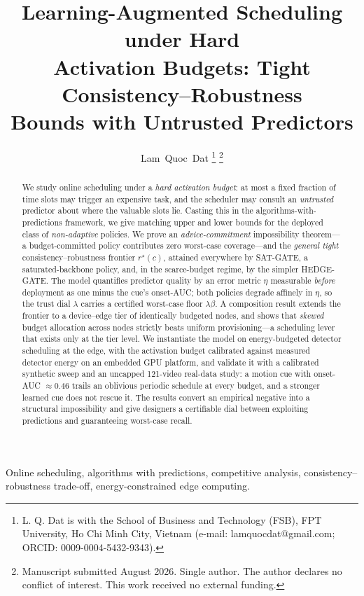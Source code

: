 ﻿\documentclass[lettersize,journal]{IEEEtran}
\begin{document}
\title{Learning-Augmented Scheduling under Hard\\ Activation Budgets: Tight Consistency--Robustness\\ Bounds with Untrusted Predictors}
\author{Lam~Quoc~Dat%
\thanks{L. Q. Dat is with the School of Business and Technology (FSB), FPT University, Ho Chi Minh City, Vietnam (e-mail: lamquocdat@gmail.com; ORCID: 0009-0004-5432-9343).}%
\thanks{Manuscript submitted August 2026. Single author. The author declares no conflict of interest. This work received no external funding.}}
\markboth{}{}
\maketitle
\begin{abstract}
We study online scheduling under a \emph{hard activation budget}: at most a fixed fraction of time slots may trigger an expensive task, and the scheduler may consult an \emph{untrusted} predictor about where the valuable slots lie. Casting this in the algorithms-with-predictions framework, we give matching upper and lower bounds for the deployed class of \emph{non-adaptive} policies. We prove an \emph{advice-commitment} impossibility theorem---a budget-committed policy contributes zero worst-case coverage---and the \emph{general tight} consistency--robustness frontier $r^\star(c)$, attained everywhere by SAT-GATE, a saturated-backbone policy, and, in the scarce-budget regime, by the simpler HEDGE-GATE. The model quantifies predictor quality by an error metric $\eta$ measurable \emph{before} deployment as one minus the cue's onset-AUC; both policies degrade affinely in $\eta$, so the trust dial $\lambda$ carries a certified worst-case floor $\lambda\beta$. A composition result extends the frontier to a device--edge tier of identically budgeted nodes, and shows that \emph{skewed} budget allocation across nodes strictly beats uniform provisioning---a scheduling lever that exists only at the tier level. We instantiate the model on energy-budgeted detector scheduling at the edge, with the activation budget calibrated against measured detector energy on an embedded GPU platform, and validate it with a calibrated synthetic sweep and an uncapped 121-video real-data study: a motion cue with onset-AUC $\approx 0.46$ trails an oblivious periodic schedule at every budget, and a stronger learned cue does not rescue it. The results convert an empirical negative into a structural impossibility and give designers a certifiable dial between exploiting predictions and guaranteeing worst-case recall.
\end{abstract}
\begin{IEEEkeywords}
Online scheduling, algorithms with predictions, competitive analysis, consistency--robustness trade-off, energy-constrained edge computing.
\end{IEEEkeywords}
\IEEEpeerreviewmaketitle
\end{document}
